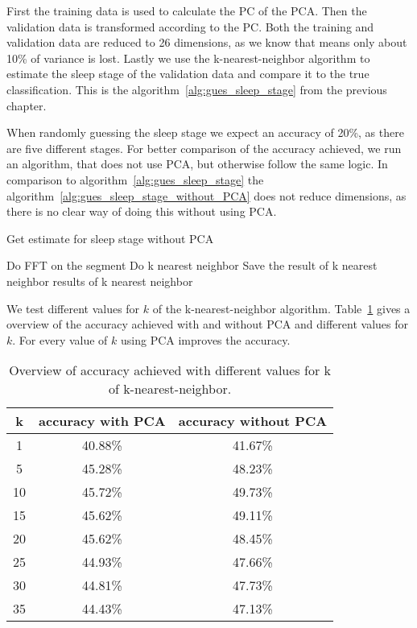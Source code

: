 First the training data is used to calculate the PC of the PCA. Then the validation data is transformed according to the PC. Both the training and validation data are reduced to 26 dimensions, as we know that means only about 10\% of variance is lost. Lastly we use the k-nearest-neighbor algorithm to estimate the sleep stage of the validation data and compare it to the true classification. This is the algorithm~\ref{alg:gues_sleep_stage} from the previous chapter.

When randomly guessing the sleep stage we expect an accuracy of 20\%, as there are five different stages. For better comparison of the accuracy achieved, we run an algorithm, that does not use PCA, but otherwise follow the same logic. In comparison to algorithm~\ref{alg:gues_sleep_stage} the algorithm~\ref{alg:gues_sleep_stage_without_PCA} does not reduce dimensions, as there is no clear way of doing this without using PCA.

\begin{algorithm}
	\caption{Get estimate for sleep stage without PCA}\label{alg:gues_sleep_stage_without_PCA}
	\begin{algorithmic}
		\State Do FFT on the segment
		\State Do k nearest neighbor
		\State Save the result of k nearest neighbor
		\EndFor
		\State \Return results of k nearest neighbor
	\end{algorithmic}
\end{algorithm}

We test different values for $k$ of the k-nearest-neighbor algorithm. Table~\ref{tab:error_validation_overview} gives a overview of the accuracy achieved with and without PCA and different values for $k$. For every value of $k$ using PCA improves the accuracy.

\begin{table}
	\centering
	\begin{tabular}{c|c|c}
		k & accuracy with PCA & accuracy without PCA \\
		\hline
		1  & 40.88\% & 41.67\% \\
		5  & 45.28\% & 48.23\% \\
		10 & 45.72\% & 49.73\% \\
		15 & 45.62\% & 49.11\% \\
		20 & 45.62\% & 48.45\% \\
		25 & 44.93\% & 47.66\% \\
		30 & 44.81\% & 47.73\% \\
		35 & 44.43\% & 47.13\% \\
	\end{tabular}
	\caption{Overview of accuracy achieved with different values for k of k-nearest-neighbor.}
	\label{tab:error_validation_overview}
\end{table}

